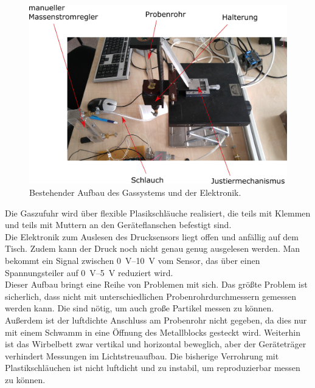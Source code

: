 \begin{figure}[h!]
	\begin{center}
		\includegraphics[scale=0.3]{Altes_Wirbelbett_oben.png}
		\caption[Bestehender Aufbau des Gassystems und der Elektronik]{Bestehender Aufbau des Gassystems und der Elektronik.}
	\end{center}
\end{figure}	


Die Gaszufuhr wird über flexible Plasikschläuche realisiert, die teils mit Klemmen und teils mit Muttern an den Geräteflanschen befestigt sind. \\
Die Elektronik zum Auslesen des Drucksensors liegt offen und anfällig auf dem Tisch. Zudem kann der Druck noch nicht genau genug ausgelesen werden. Man bekommt ein Signal zwischen \SIrange{0}{10}{\volt} vom Sensor, das über einen Spannungsteiler auf \SIrange{0}{5}{\volt} reduziert wird. \\
Dieser Aufbau bringt eine Reihe von Problemen mit sich. Das größte Problem ist sicherlich, dass nicht mit unterschiedlichen Probenrohrdurchmessern gemessen werden kann. Die sind nötig, um auch große Partikel messen zu können. Außerdem ist der luftdichte Anschluss am Probenrohr nicht gegeben, da dies nur mit einem Schwamm in eine Öffnung des Metallblocks gesteckt wird.
Weiterhin ist das Wirbelbett zwar vertikal und horizontal beweglich, aber der Geräteträger verhindert Messungen im Lichtstreuaufbau.
Die bisherige Verrohrung mit Plastikschläuchen ist nicht luftdicht und zu instabil, um reproduzierbar messen zu können. \\


